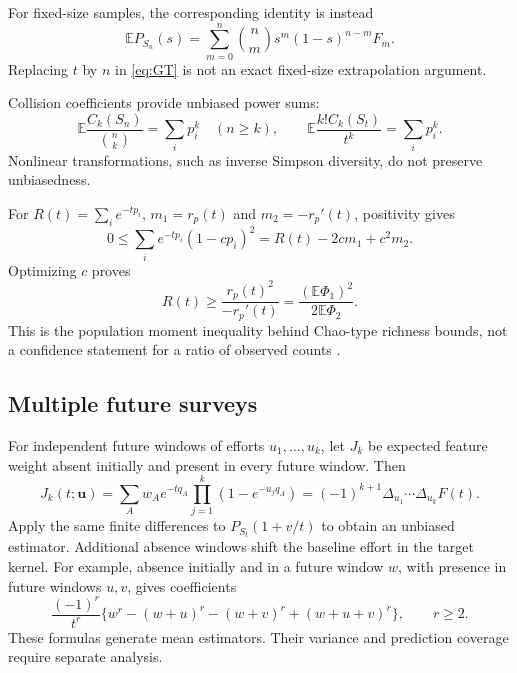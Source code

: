 \documentclass[11pt]{article}
\numberwithin{equation}{section}
\theoremstyle{definition}
\theoremstyle{remark}
\newcommand{\E}{\mathbb E}
\begin{document}
For fixed-size samples, the corresponding identity is instead
\[
 \E P_{S_n}(s)=\sum_{m=0}^n\binom nm s^m(1-s)^{n-m}F_m.
\]
Replacing $t$ by $n$ in \eqref{eq:GT} is not an exact fixed-size extrapolation argument.

Collision coefficients provide unbiased power sums:
\begin{equation}\label{eq:powers}
 \E\frac{C_k(S_n)}{\binom nk}=\sum_i p_i^k\quad(n\ge k),\qquad
 \E\frac{k!C_k(S_t)}{t^k}=\sum_i p_i^k.
\end{equation}
Nonlinear transformations, such as inverse Simpson diversity, do not preserve unbiasedness.

For $R(t)=\sum_i e^{-tp_i}$, $m_1=r_p(t)$ and $m_2=-r_p'(t)$, positivity gives
\[
 0\le\sum_i e^{-tp_i}(1-cp_i)^2=R(t)-2cm_1+c^2m_2.
\]
Optimizing $c$ proves
\begin{equation}\label{eq:Chao}
 R(t)\ge\frac{r_p(t)^2}{-r_p'(t)}
 =\frac{(\E\Phi_1)^2}{2\E\Phi_2}.
\end{equation}
This is the population moment inequality behind Chao-type richness bounds, not a confidence statement for a ratio of observed counts \cite{Chao1984,DaleySmith2016}.

\subsection{Multiple future surveys}
For independent future windows of efforts $u_1,\ldots,u_k$, let $J_k$ be expected feature weight absent initially and present in every future window. Then
\begin{equation}\label{eq:multifuture}
 J_k(t;\bm u)=\sum_Aw_Ae^{-tq_A}\prod_{j=1}^k(1-e^{-u_jq_A})
 =(-1)^{k+1}\Delta_{u_1}\cdots\Delta_{u_k}F(t).
\end{equation}
Apply the same finite differences to $P_{S_t}(1+v/t)$ to obtain an unbiased estimator. Additional absence windows shift the baseline effort in the target kernel. For example, absence initially and in a future window $w$, with presence in future windows $u,v$, gives coefficients
\[
 \frac{(-1)^r}{t^r}\{w^r-(w+u)^r-(w+v)^r+(w+u+v)^r\},\qquad r\ge2.
\]
These formulas generate mean estimators. Their variance and prediction coverage require separate analysis.
\end{document}
